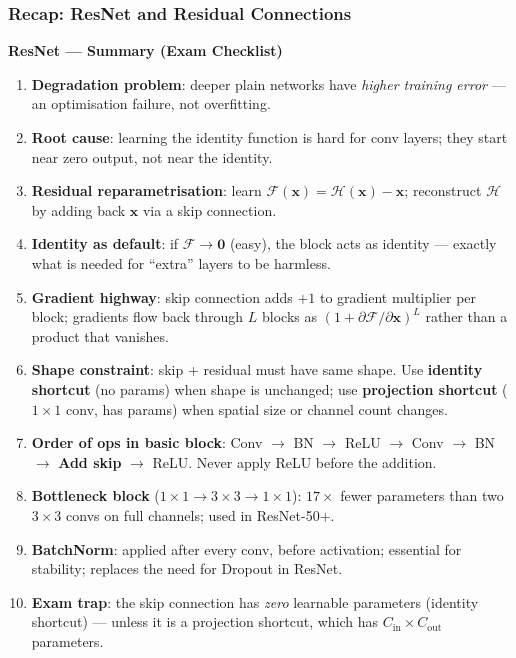\documentclass[11pt,a4paper]{article}
\begin{document}
\subsubsection{Recap: ResNet and Residual Connections}

\begin{tcolorbox}[colback=WarningRedBg,colframe=WarningRed,boxrule=0.8pt,arc=3pt]
\textbf{ResNet — Summary (Exam Checklist)}
\begin{enumerate}
  \item \textbf{Degradation problem}: deeper plain networks have \emph{higher training error}
    — an optimisation failure, not overfitting.
  \item \textbf{Root cause}: learning the identity function is hard for conv layers; they
    start near zero output, not near the identity.
  \item \textbf{Residual reparametrisation}: learn $\mathcal{F}(\mathbf{x}) = \mathcal{H}(\mathbf{x}) - \mathbf{x}$;
    reconstruct $\mathcal{H}$ by adding back $\mathbf{x}$ via a skip connection.
  \item \textbf{Identity as default}: if $\mathcal{F} \to \mathbf{0}$ (easy), the block acts
    as identity — exactly what is needed for ``extra'' layers to be harmless.
  \item \textbf{Gradient highway}: skip connection adds $+1$ to gradient multiplier per block;
    gradients flow back through $L$ blocks as $(1 + \partial\mathcal{F}/\partial\mathbf{x})^L$
    rather than a product that vanishes.
  \item \textbf{Shape constraint}: skip + residual must have same shape.  Use
    \textbf{identity shortcut} (no params) when shape is unchanged; use
    \textbf{projection shortcut} ($1\times1$ conv, has params) when spatial size or channel
    count changes.
  \item \textbf{Order of ops in basic block}: Conv $\to$ BN $\to$ ReLU $\to$ Conv $\to$ BN
    $\to$ \textbf{Add skip} $\to$ ReLU.  Never apply ReLU before the addition.
  \item \textbf{Bottleneck block} ($1\times1\to3\times3\to1\times1$): $17\times$ fewer
    parameters than two $3\times3$ convs on full channels; used in ResNet-50+.
  \item \textbf{BatchNorm}: applied after every conv, before activation; essential for
    stability; replaces the need for Dropout in ResNet.
  \item \textbf{Exam trap}: the skip connection has \emph{zero} learnable parameters (identity
    shortcut) — unless it is a projection shortcut, which has $C_\text{in}\times C_\text{out}$
    parameters.
\end{enumerate}
\end{tcolorbox}
\end{document}
